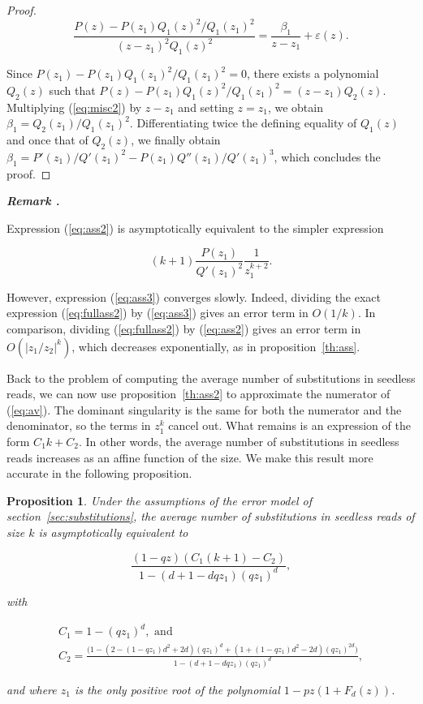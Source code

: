 \documentclass{article}
\newtheorem{proposition}{Proposition}
\newcounter{remarkcounter}
\newenvironment{remark}
{\small\it\vspace{0.5\baselineskip}
  \refstepcounter{remarkcounter}%
  \noindent\textbf{Remark \arabic{remarkcounter}.}%
}{\vspace{0.5\baselineskip}}
\begin{document}
\begin{proof}
\begin{equation}
\label{eq:misc2}
\frac{P(z) - P(z_1)Q_1(z)^2/Q_1(z_1)^2}{(z-z_1)^2Q_1(z)^2} =
\frac{\beta_1}{z-z_1} + \varepsilon(z).
\end{equation}

Since $P(z_1) - P(z_1)Q_1(z_1)^2/Q_1(z_1)^2 = 0$, there exists a
polynomial $Q_2(z)$ such that $P(z) - P(z_1)Q_1(z)^2/Q_1(z_1)^2 =
(z-z_1)Q_2(z)$.  Multiplying (\ref{eq:misc2}) by $z-z_1$ and setting $z =
z_1$, we obtain $\beta_1 = Q_2(z_1)/Q_1(z_1)^2$. Differentiating twice the
defining equality of $Q_1(z)$ and once that of $Q_2(z)$, we finally obtain
$\beta_1 = P'(z_1)/Q'(z_1)^2 - P(z_1)Q''(z_1)/Q'(z_1)^3$, which concludes
the proof.
\end{proof}


\begin{remark}
Expression (\ref{eq:ass2}) is asymptotically equivalent to the simpler
expression

\begin{equation}
\label{eq:ass3}
(k+1)\frac{P(z_1)}{Q'(z_1)^2}\frac{1}{z_1^{k+2}}.
\end{equation}

However, expression (\ref{eq:ass3}) converges slowly. Indeed, dividing
the exact expression (\ref{eq:fullass2}) by (\ref{eq:ass3}) gives an error
term in $O(1/k)$. In comparison, dividing (\ref{eq:fullass2}) by
(\ref{eq:ass2}) gives an error term in $O(|z_1/z_2|^k)$, which decreases
exponentially, as in proposition~\ref{th:ass}.
\end{remark}




Back to the problem of computing the average number of substitutions in
seedless reads, we can now use proposition~\ref{th:ass2} to approximate
the numerator of (\ref{eq:av}). The dominant singularity is the same for
both the numerator and the denominator, so the terms in $z_1^k$ cancel
out. What remains is an expression of the form $C_1k + C_2$. In other
words, the average number of substitutions in seedless reads increases as
an affine function of the size. We make this result more accurate in the
following proposition.


\begin{proposition}
\label{th:avsub}
Under the assumptions of the error model of
section~\ref{sec:substitutions}, the average number of substitutions in
seedless reads of size $k$ is asymptotically equivalent to

\begin{equation*}
\frac{(1-qz)(C_1(k+1) - C_2)}{1-(d+1-dqz_1)(qz_1)^d},
\end{equation*}

\noindent
with

\begin{gather*}
C_1 = 1-(qz_1)^d, \text{ and} \\
C_2 = \frac{
\big(1-(2-(1-qz_1)d^2+2d)(qz_1)^d+(1+(1-qz_1)d^2-2d)(qz_1)^{2d} \big)}
{1-(d+1-dqz_1)(qz_1)^d},
\end{gather*}

\noindent
and where $z_1$ is the only positive root of the polynomial
$1-pz(1+F_d(z))$.
\end{proposition}
\end{document}
